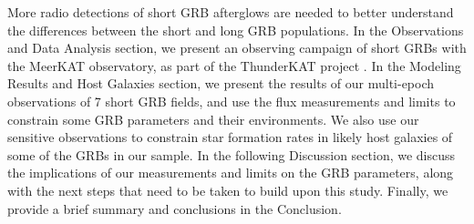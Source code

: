 \documentclass[12pt]{article}
\begin{document}
More radio detections of short GRB afterglows are needed to better understand the differences between the short and long GRB populations. In the Observations and Data Analysis section, we present an observing campaign of short GRBs with the MeerKAT observatory, as part of the ThunderKAT project \citep{2016mks..confE..13F}. In the Modeling Results and Host Galaxies section, we present the results of our multi-epoch observations of 7 short GRB fields, and use the flux measurements and limits to constrain some GRB parameters and their environments. We also use our sensitive observations to constrain star formation rates in likely host galaxies of some of the GRBs in our sample. In the following Discussion section, we discuss the implications of our measurements and limits on the GRB parameters, along with the next steps that need to be taken to build upon this study. Finally, we provide a brief summary and conclusions in the Conclusion.
\end{document}
